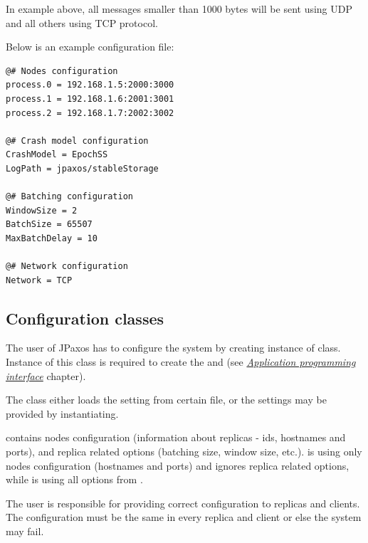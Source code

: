 In example above, all messages smaller than 1000 bytes will be sent using UDP
and all others using TCP protocol.

\label{config:example-file}
Below is an example configuration file:

\begin{Verbatim}[commandchars=@\[\]]
@# Nodes configuration
process.0 = 192.168.1.5:2000:3000
process.1 = 192.168.1.6:2001:3001
process.2 = 192.168.1.7:2002:3002

@# Crash model configuration
CrashModel = EpochSS
LogPath = jpaxos/stableStorage

@# Batching configuration
WindowSize = 2
BatchSize = 65507
MaxBatchDelay = 10

@# Network configuration
Network = TCP
\end{Verbatim}


\subsection{Configuration classes}
\label{config:configuration-classes}
The user of JPaxos has to configure the system by creating instance of
 class. Instance of this class is required to create the
 and  (see {\hyperref[api:jpaxos-api]{\emph{Application programming interface}}} chapter).

The  class either loads the setting from certain file, or the
settings may be provided by instantiating.

 contains nodes configuration (information about replicas - ids,
hostnames and ports), and replica related options (batching size, window size,
etc.).  is using only nodes configuration (hostnames and ports) and
ignores replica related options, while  is using all options from
.

The user is responsible for providing correct configuration to replicas and
clients. The configuration must be the same in every replica and client or else
the system may fail.


